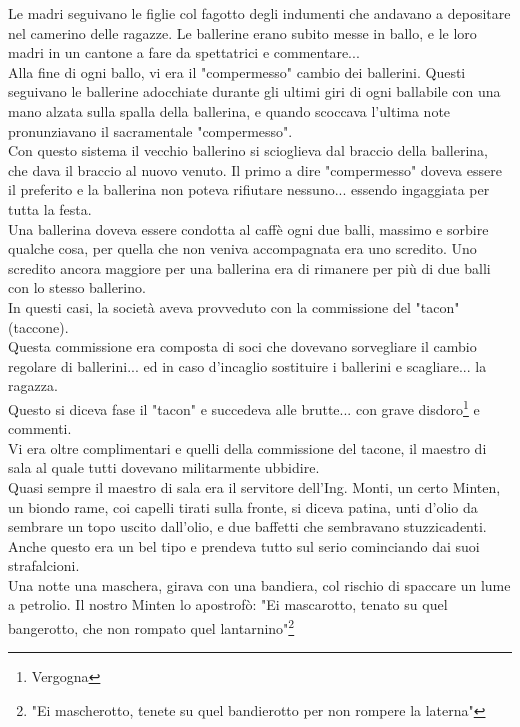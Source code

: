 Le madri seguivano le figlie col fagotto degli indumenti che andavano a depositare nel camerino delle ragazze. Le ballerine erano subito messe in ballo, e le loro madri in un cantone a fare da spettatrici e commentare...\\
Alla fine di ogni ballo, vi era il "compermesso" cambio dei ballerini. Questi seguivano le ballerine adocchiate durante gli ultimi giri di ogni ballabile con una mano alzata sulla spalla della ballerina, e quando scoccava l'ultima note pronunziavano il sacramentale "compermesso".\\
Con questo sistema il vecchio ballerino si scioglieva dal braccio della ballerina, che dava il braccio al nuovo venuto. Il primo a dire "compermesso" doveva essere il preferito e la ballerina non poteva rifiutare nessuno... essendo ingaggiata per tutta la festa.\\
Una ballerina doveva essere condotta al caffè ogni due balli, massimo e sorbire qualche cosa, per quella che non veniva accompagnata era uno scredito. Uno scredito ancora maggiore per una ballerina era di rimanere per più di due balli con lo stesso ballerino.\\
In questi casi, la società aveva provveduto con la commissione del "tacon" (taccone).\\
Questa commissione era composta di soci che dovevano sorvegliare il cambio regolare di ballerini... ed in caso d'incaglio sostituire i ballerini e scagliare... la ragazza.\\
Questo si diceva fase il "tacon" e succedeva alle brutte... con grave disdoro\footnote{Vergogna} e commenti.\\
Vi era oltre complimentari e quelli della commissione del tacone, il maestro di sala al quale tutti dovevano militarmente ubbidire. \\
Quasi sempre il maestro di sala era il servitore dell'Ing. Monti, un certo Minten, un biondo rame, coi capelli tirati sulla fronte, si diceva patina, unti d'olio da sembrare un topo uscito dall'olio, e due baffetti che sembravano stuzzicadenti. \\
Anche questo era un bel tipo e prendeva tutto sul serio cominciando dai suoi strafalcioni.\\
Una notte una maschera, girava con una bandiera, col rischio di spaccare un lume a petrolio. Il nostro Minten lo apostrofò: "Ei mascarotto, tenato su quel bangerotto, che non rompato quel lantarnino"\footnote{"Ei mascherotto, tenete su quel bandierotto per non rompere la laterna"}\\
